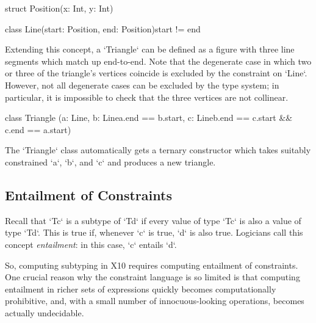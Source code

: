 \begin{xten}
struct Position(x: Int, y: Int) {}

class Line(start: Position, end: Position){start != end} {}
\end{xten}


Extending this concept, a \xcd`Triangle` can be defined as a figure with three
line segments which match up end-to-end.  Note that the degenerate case in
which two or three of the triangle's vertices coincide is excluded by the
constraint on \xcd`Line`.  However, not all degenerate cases can be excluded
by the type system; in particular, it is impossible to check that the three
vertices are not collinear. 

% 
\begin{xten}
class Triangle 
 (a: Line, 
  b: Line{a.end == b.start}, 
  c: Line{b.end == c.start && c.end == a.start})  
 {
 }
\end{xten}
%

The \xcd`Triangle` class automatically gets a ternary constructor which takes
suitably constrained \xcd`a`, \xcd`b`, and \xcd`c` and produces a new
triangle. 


\subsection{Entailment of Constraints}


Recall that \xcd`T{c}` is a subtype of \xcd`T{d}` if every value of type
\xcd`T{c}` is also a value of type \xcd`T{d}`.  This is true if, whenever
\xcd`c` is true, \xcd`d` is also true.  Logicians call this concept {\em
entailment}: in this case, \xcd`c` entails \xcd`d`.  

So, computing subtyping in X10 requires computing entailment of constraints.
One crucial reason why the constraint language is so limited is that computing
entailment in richer sets of expressions quickly becomes computationally
prohibitive, and, with a small number of innocuous-looking operations, becomes
actually undecidable.  



